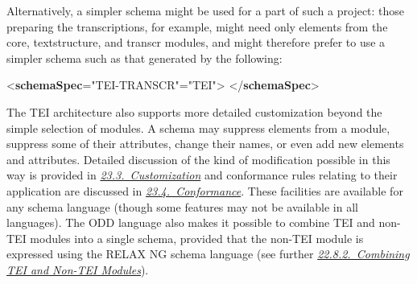 Alternatively, a simpler schema might be used for a part of such a project: those preparing the transcriptions, for example, might need only elements from the \textsf{core}, \textsf{textstructure}, and \textsf{transcr} modules, and might therefore prefer to use a simpler schema such as that generated by the following: \par\bgroup{}\exampleFont \begin{shaded}\noindent\mbox{}{<\textbf{schemaSpec}\hspace*{1em}{ident}="{TEI-TRANSCR}"\hspace*{1em}{start}="{TEI}">}\mbox{}\newline 
{}\mbox{}\newline 
{}\mbox{}\newline 
{}\mbox{}\newline 
{}\mbox{}\newline 
{</\textbf{schemaSpec}>}\end{shaded}\egroup\par \par
The TEI architecture also supports more detailed customization beyond the simple selection of modules. A schema may suppress elements from a module, suppress some of their attributes, change their names, or even add new elements and attributes. Detailed discussion of the kind of modification possible in this way is provided in \textit{\hyperref[MD]{23.3.\ Customization}} and conformance rules relating to their application are discussed in \textit{\hyperref[CF]{23.4.\ Conformance}}. These facilities are available for any schema language (though some features may not be available in all languages). The ODD language also makes it possible to combine TEI and non-TEI modules into a single schema, provided that the non-TEI module is expressed using the RELAX NG schema language (see further \textit{\hyperref[ST-aliens]{22.8.2.\ Combining TEI and Non-TEI Modules}}).
